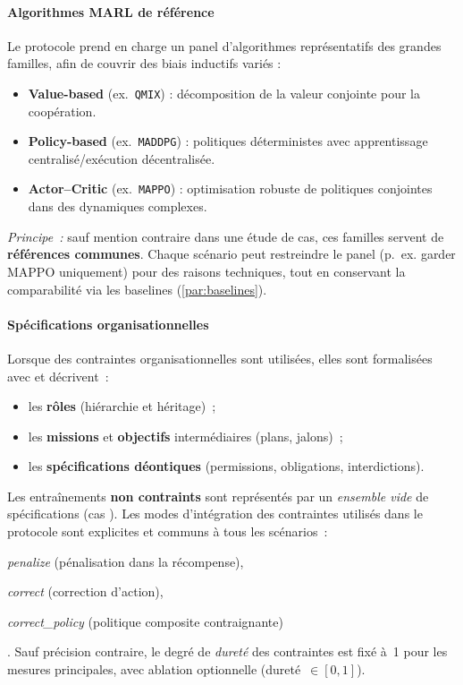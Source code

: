\paragraph{Algorithmes MARL de référence}
Le protocole prend en charge un panel d’algorithmes représentatifs des grandes familles, afin de couvrir des biais inductifs variés :
\begin{itemize}
  \item \textbf{Value-based} (ex.~\texttt{QMIX}) : décomposition de la valeur conjointe pour la coopération.
  \item \textbf{Policy-based} (ex.~\texttt{MADDPG}) : politiques déterministes avec apprentissage centralisé/exécution décentralisée.
  \item \textbf{Actor--Critic} (ex.~\texttt{MAPPO}) : optimisation robuste de politiques conjointes dans des dynamiques complexes.
\end{itemize}
\textit{Principe~:} sauf mention contraire dans une étude de cas, ces familles servent de \textbf{références communes}. Chaque scénario peut restreindre le panel (p.~ex. garder MAPPO uniquement) pour des raisons techniques, tout en conservant la comparabilité via les baselines (\autoref{par:baselines}).

\paragraph{Spécifications organisationnelles}
Lorsque des contraintes organisationnelles sont utilisées, elles sont formalisées avec  et décrivent~:
\begin{itemize}
  \item les \textbf{rôles} (hiérarchie et héritage)~;
  \item les \textbf{missions} et \textbf{objectifs} intermédiaires (plans, jalons)~;
  \item les \textbf{spécifications déontiques} (permissions, obligations, interdictions).
\end{itemize}
Les entraînements \textbf{non contraints} sont représentés par un \textit{ensemble vide} de spécifications (cas ). Les modes d’intégration des contraintes utilisés dans le protocole sont explicites et communs à tous les scénarios~:
\begin{enumerate*}[label=\roman*)]
  \item \textit{penalize} (pénalisation dans la récompense),
  \item \textit{correct} (correction d’action),
  \item \textit{correct\_policy} (politique composite contraignante)
\end{enumerate*}.
Sauf précision contraire, le degré de \textit{dureté} des contraintes est fixé à~1 pour les mesures principales, avec ablation optionnelle (dureté~$\in[0,1]$).

